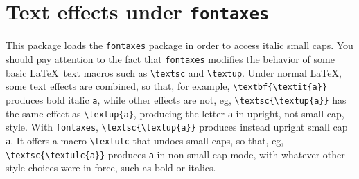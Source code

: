 \documentclass[11pt]{article}
\begin{document}
\section{Text effects under \texttt{fontaxes}}
This package loads the {\tt fontaxes} package in order to access italic small caps. You should pay attention to the fact that {\tt fontaxes} modifies the behavior of some basic \LaTeX\ text macros such as \verb|\textsc| and \verb|\textup|. Under normal \LaTeX, some text effects are combined, so that, for example, \verb|\textbf{\textit{a}}| produces bold italic {\tt a}, while other effects are not, eg, \verb|\textsc{\textup{a}}| has the same effect as \verb|\textup{a}|, producing the letter {\tt a} in upright, not small cap, style. With {\tt fontaxes}, \verb|\textsc{\textup{a}}| produces instead upright small cap {\tt a}. It offers a macro \verb|\textulc| that undoes small caps, so that, eg, \verb|\textsc{\textulc{a}}| produces {\tt a} in non-small cap mode, with whatever other style choices were in force, such as bold or italics.
\end{document}
